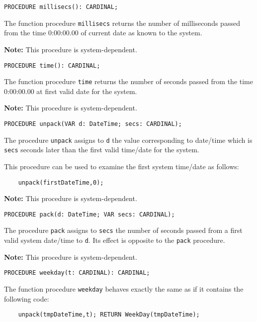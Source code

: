 {\samepage
{}
\begin{verbatim}
PROCEDURE millisecs(): CARDINAL;
\end{verbatim}
}
\ModuleList
The function procedure \verb'millisecs' returns the number of
milliseconds passed from the time 0:00:00.00 of current date
as known to the system.

{\bf Note:} This procedure is system-dependent.

{\samepage
{}
\begin{verbatim}
PROCEDURE time(): CARDINAL;
\end{verbatim}
}
\ModuleList
The function procedure \verb'time' returns the number of seconds
passed from the time 0:00:00.00 at first valid date for the system.

{\bf Note:} This procedure is system-dependent.

{\samepage
{}
\begin{verbatim}
PROCEDURE unpack(VAR d: DateTime; secs: CARDINAL);
\end{verbatim}
}
\ModuleList
The procedure \verb'unpack' assigns to \verb'd' the value
corresponding to date/time which is \verb'secs' seconds later than
the first valid time/date for the system.

This procedure can be used to examine the first system time/date
as follows:

\verb'    unpack(firstDateTime,0);'

{\bf Note:} This procedure is system-dependent.

{\samepage
{}
\begin{verbatim}
PROCEDURE pack(d: DateTime; VAR secs: CARDINAL);
\end{verbatim}
}
\ModuleList
The procedure \verb'pack' assigns to \verb'secs' the number of
seconds passed from a first valid system date/time to \verb'd'.
Its effect is opposite to the \verb'pack' procedure. %

{\bf Note:} This procedure is system-dependent.

{\samepage
{}
\begin{verbatim}
PROCEDURE weekday(t: CARDINAL): CARDINAL;
\end{verbatim}
}
\ModuleList
The function procedure \verb'weekday' behaves exactly the same as if it
contains the following code:

\verb'    unpack(tmpDateTime,t); RETURN WeekDay(tmpDateTime);'

